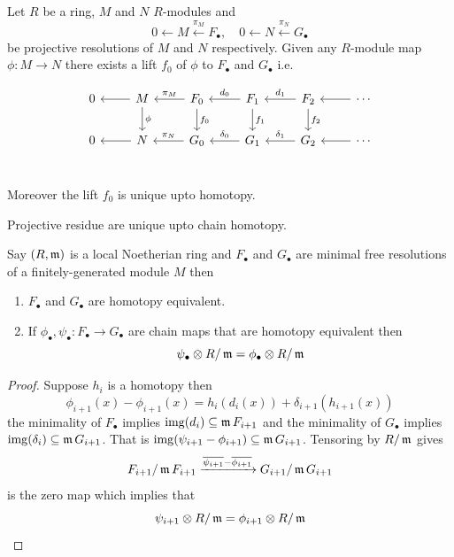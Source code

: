 \documentclass[12pt]{amsart}
\begin{document}
\begin{theorem}
    Let $R$ be a ring, $M$ and $N$ $R$-modules and 
    \[0 \leftarrow M \xleftarrow{\pi_M} F_\bullet, \quad 0 \leftarrow N \xleftarrow{\pi_N} G_\bullet\]
    be projective resolutions of $M$ and $N$ respectively. Given any $R$-module map $\phi: M \to N$ there exists a lift $f_0$ of $\phi$ to $F_\bullet$ and $G_\bullet$ i.e. 

    \[\begin{tikzcd}
        0 & M \ar[l] \ar[d, "\phi"] & F_0 \ar[d, "f_0"] \ar[l, "\pi_M", swap] & F_1 \ar[l, swap, "d_0"] \ar[d, "f_1"]  & F_2 \ar[l, swap, "d_1"] \ar[d, "f_2"]  & \cdots \ar[l, swap] \\ 
        0 & N \ar[l] & G_0 \ar[l, "\pi_N", swap] & G_1 \ar[l, swap, "\delta_0"]  & G_2 \ar[l, swap, "\delta_1"]  & \cdots \ar[l, swap] \\ 
    \end{tikzcd}\]

    Moreover the lift $f_0$ is unique upto homotopy. 
\end{theorem}

\begin{corollary}
    Projective residue are unique upto chain homotopy. 
\end{corollary}

\begin{corollary}
    Say $(R, \operatorname{\mathfrak{m}})$ is a local Noetherian ring and $F_\bullet$ and $G_\bullet$ are minimal free resolutions of a finitely-generated module $M$ then
    \begin{enumerate}
        \item $F_\bullet$ and $G_\bullet$ are homotopy equivalent. 
        \item If $\phi_\bullet, \psi_\bullet: F_\bullet \to G_\bullet$ are chain maps that are homotopy equivalent then 
        \[\psi_\bullet \otimes R / \operatorname{\mathfrak{m}}  =  \phi_\bullet \otimes R / \operatorname{\mathfrak{m}}\]
    \end{enumerate}
\end{corollary}

\begin{proof}
    Suppose $h_i$ is a homotopy then 
    \[\phi_{i+1}(x) - \phi_{i+1}(x) = h_i(d_i(x)) + \delta_{i+1}(h_{i+1}(x))\]
    the minimality of $F_\bullet$ implies $\operatorname{img}(d_i) \subseteq \operatorname{\mathfrak{m}} F_{i+1}$ and the minimality of $G_\bullet$ implies $\operatorname{img}(\delta_i) \subseteq \operatorname{\mathfrak{m}} G_{i+1}$. That is $\operatorname{img}(\psi_{i + 1} - \phi_{i+1}) \subseteq \operatorname{\mathfrak{m}} G_{i+1}$. Tensoring by $R/\operatorname{\mathfrak{m}}$ gives 
    \[F_{i+1} / \operatorname{\mathfrak{m}} F_{i+1} \xrightarrow{\overline{\psi_{i+1}} - \overline{\phi_{i+1}}} G_{i+1} / \operatorname{\mathfrak{m}} G_{i+1}\]
    is the zero map which implies that 
    \[\psi_{i+1} \otimes R / \operatorname{\mathfrak{m}}  =  \phi_{i+1} \otimes R / \operatorname{\mathfrak{m}}\]
\end{proof}
\end{document}
